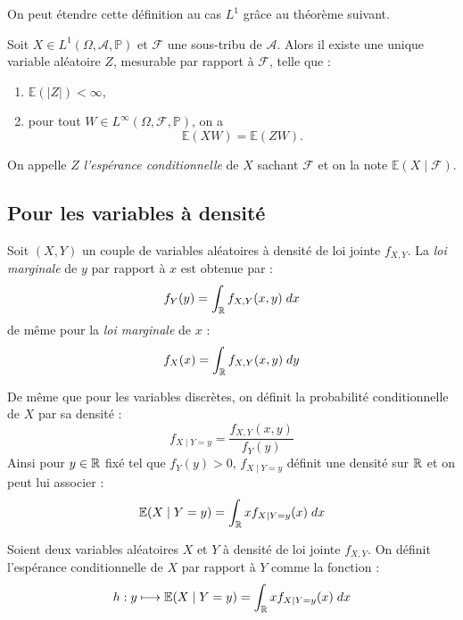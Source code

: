 On peut étendre cette définition au cas $L^1$ grâce au théorème suivant.

\begin{theorem}[Existence]
    Soit $X \in L^1(\Omega, \mathcal{A}, \mathbb{P})$ et 
    $\mathcal{F}$ une sous-tribu de $\mathcal{A}$. 
    Alors il existe une unique variable aléatoire $Z$, 
    mesurable par rapport à $\mathcal{F}$, telle que :
    \begin{enumerate}[label=\roman*)]
        \item $\mathbb{E}(|Z|) < \infty$, 
        \item pour tout $W \in L^\infty(\Omega, \mathcal{F}, \mathbb{P})$, on a
        \[
            \mathbb{E}(XW) = \mathbb{E}(ZW).
        \]
    \end{enumerate}
    On appelle $Z$ \emph{l'espérance conditionnelle} de $X$ sachant $\mathcal{F}$ 
    et on la note $\mathbb{E}(X \mid \mathcal{F})$.
\end{theorem}

\subsection{Pour les variables à densité}

\begin{rappel}
    Soit $(X,Y)$ un couple de variables aléatoires à densité de loi jointe $f_{X,Y}$. 
    La \emph{loi marginale} de $y$ par rapport à $x$ est obtenue par : 
        $$ f_Y(y) = \int_{\mathbb{R}} f_{X,Y}(x,y) \; dx $$ 
    de même pour la \emph{loi marginale} de $x$ : 
        $$ f_X(x) = \int_{\mathbb{R}} f_{X,Y}(x,y) \; dy $$
\end{rappel}

\begin{definition}
    De même que pour les variables discrètes, on définit la probabilité conditionnelle de $X$ par sa densité : 
        $$ f_{X \mid Y = y} = \frac{f_{X,Y}(x,y)}{f_Y(y)} $$
    Ainsi pour $y \in \mathbb{R}$ fixé tel que  $f_Y(y) > 0$, $f_{X \mid Y = y}$ définit une densité sur $\mathbb{R}$ 
    et on peut lui associer : 
        $$ \mathbb{E}(X \mid Y = y) = \int_{\mathbb{R}} x f_{X \mid Y = y} (x) \; dx $$ 
\end{definition}

\begin{definition}
    Soient deux variables aléatoires $X$ et $Y$ à densité de loi jointe $f_{X,Y}$. 
    On définit l'espérance conditionnelle de $X$ par rapport à $Y$ comme la fonction : 
        $$ h : y \longmapsto \mathbb{E}(X \mid Y = y) = \int_{\mathbb{R}} x f_{X \mid Y = y} (x) \; dx $$
\end{definition}

